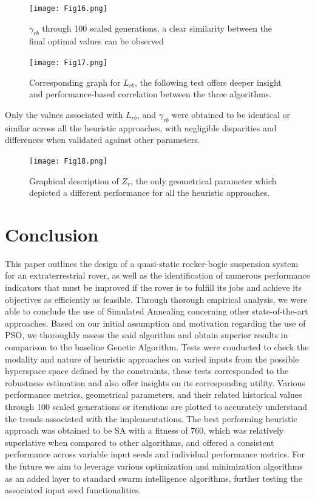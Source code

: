 \documentclass[default,iicol]{sn-jnl}
\theoremstyle{thmstyleone}
\theoremstyle{thmstyletwo}
\theoremstyle{thmstylethree}
\begin{document}
\begin{figure}
\centering
\texttt{[image: Fig16.png]}
\caption{$\gamma_{rb}$ through 100 scaled generations, a clear similarity between the final optimal values can be observed}\label{fig16}
\end{figure}

\begin{figure}
\centering
\texttt{[image: Fig17.png]}
\caption{Corresponding graph for $L_{rb}$, the following test offers deeper insight and performance-based correlation between the three algorithms.}\label{fig17}
\end{figure}

Only the values associated with $L_{rb}$, and $\gamma_{rb}$ were obtained to be identical or similar across all the heuristic approaches, with negligible disparities and differences when validated against other parameters.

\begin{figure}
\centering
\texttt{[image: Fig18.png]}
\caption{ Graphical description of $Z_{r}$, the only geometrical parameter which depicted a different performance for all the heuristic approaches.
}\label{fig18}
\end{figure}



\section{Conclusion}\label{sec6}

This paper outlines the design of a quasi-static rocker-bogie suspension system for an extraterrestrial rover, as well as the identification of numerous performance indicators that must be improved if the rover is to fulfill its jobs and achieve its objectives as efficiently as feasible. Through thorough empirical analysis, we were able to conclude the use of Simulated Annealing concerning other state-of-the-art approaches. Based on our initial assumption and motivation regarding the use of PSO, we thoroughly assess the said algorithm and obtain superior results in comparison to the baseline Genetic Algorithm. Tests were conducted to check the modality and nature of heuristic approaches on varied inputs from the possible hyperspace space defined by the constraints, these tests corresponded to the robustness estimation and also offer insights on its corresponding utility. Various performance metrics, geometrical parameters, and their related historical values through 100 scaled generations or iterations are plotted to accurately understand the trends associated with the implementations. The best performing heuristic approach was obtained to be SA with a fitness of 760, which was relatively superlative when compared to other algorithms, and offered a consistent performance across variable input seeds and individual performance metrics. For the future we aim to leverage various optimization and minimization algorithms as an added layer to standard swarm intelligence algorithms, further testing the associated input seed functionalities.\\
\end{document}
